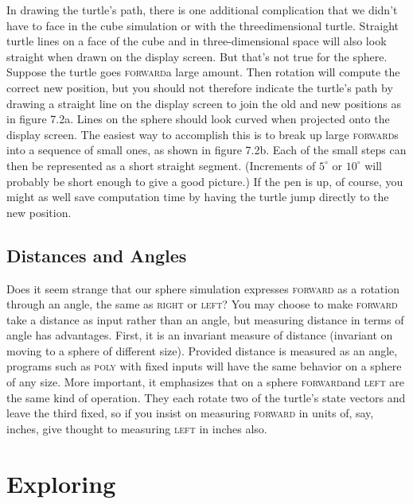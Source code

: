 \documentclass{book}
\begin{document}
In drawing the turtle's path, there is one additional complication
that we didn't have to face in the cube simulation or with the threedimensional turtle. Straight turtle lines on a face of the cube and
in three-dimensional space will also look straight when drawn on the
display screen. But that's not true for the sphere. Suppose the turtle
goes \textsc{forward}a large amount. Then rotation will compute the correct
new position, but you should not therefore indicate the turtle's path by
drawing a straight line on the display screen to join the old and new
positions as in figure 7.2a. Lines on the sphere should look curved when
projected onto the display screen. The easiest way to accomplish this is
to break up large \textsc{forward}s into a sequence of small ones, as shown in
figure 7.2b. Each of the small steps can then be represented as a short
straight segment. (Increments of $5^{\circ}$ or $10^{\circ}$ will probably be short enough
to give a good picture.) If the pen is up, of course, you might as well
save computation time by having the turtle jump directly to the new
position.

\subsection{Distances and Angles}

Does it seem strange that our sphere simulation expresses \textsc{forward} as
a rotation through an angle, the same as \textsc{right} or \textsc{left}? You may
choose to make \textsc{forward} take a distance as input rather than an angle,
but measuring distance in terms of angle has advantages. First, it is
an invariant measure of distance (invariant on moving to a sphere of
different size). Provided distance is measured as an angle, programs such
as \textsc{poly} with fixed inputs will have the same behavior on a sphere of any
size. More important, it emphasizes that on a sphere \textsc{forward}and \textsc{left}
are the same kind of operation. They each rotate two of the turtle's state
vectors and leave the third fixed, so if you insist on measuring \textsc{forward}
in units of, say, inches, give thought to measuring \textsc{left} in inches also.

\section{Exploring}
\end{document}
